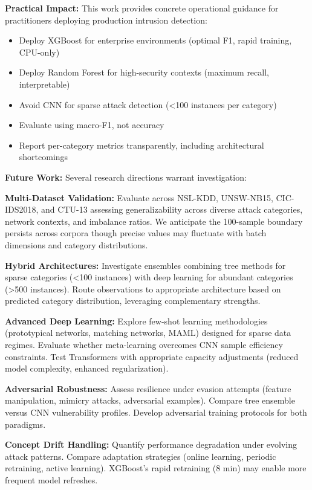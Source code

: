 \documentclass[10pt,twocolumn]{article}
\begin{document}
\textbf{Practical Impact:} This work provides concrete operational guidance for practitioners deploying production intrusion detection:
\begin{itemize}
    \item Deploy XGBoost for enterprise environments (optimal F1, rapid training, CPU-only)
    \item Deploy Random Forest for high-security contexts (maximum recall, interpretable)
    \item Avoid CNN for sparse attack detection (<100 instances per category)
    \item Evaluate using macro-F1, not accuracy
    \item Report per-category metrics transparently, including architectural shortcomings
\end{itemize}

\textbf{Future Work:} Several research directions warrant investigation:

\textbf{Multi-Dataset Validation:} Evaluate across NSL-KDD, UNSW-NB15, CIC-IDS2018, and CTU-13 assessing generalizability across diverse attack categories, network contexts, and imbalance ratios. We anticipate the 100-sample boundary persists across corpora though precise values may fluctuate with batch dimensions and category distributions.

\textbf{Hybrid Architectures:} Investigate ensembles combining tree methods for sparse categories (<100 instances) with deep learning for abundant categories (>500 instances). Route observations to appropriate architecture based on predicted category distribution, leveraging complementary strengths.

\textbf{Advanced Deep Learning:} Explore few-shot learning methodologies (prototypical networks, matching networks, MAML) designed for sparse data regimes. Evaluate whether meta-learning overcomes CNN sample efficiency constraints. Test Transformers with appropriate capacity adjustments (reduced model complexity, enhanced regularization).

\textbf{Adversarial Robustness:} Assess resilience under evasion attempts (feature manipulation, mimicry attacks, adversarial examples). Compare tree ensemble versus CNN vulnerability profiles. Develop adversarial training protocols for both paradigms.

\textbf{Concept Drift Handling:} Quantify performance degradation under evolving attack patterns. Compare adaptation strategies (online learning, periodic retraining, active learning). XGBoost's rapid retraining (8 min) may enable more frequent model refreshes.
\end{document}
